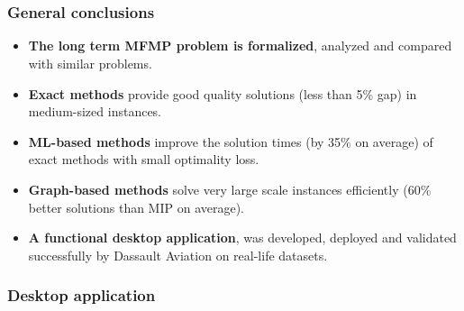 \section[Conclusions]{\conclusiontitle}

\begin{frame}
\frametitle{\textbf{General conclusions}}
    \begin{itemize}[<+->]
    \item \textbf{The long term MFMP problem is formalized}, 
      analyzed and compared with similar problems.
    \item \textbf{Exact methods}
      provide good quality solutions (less than 5\% gap) in medium-sized instances.
    \item \textbf{ML-based methods}
      improve the solution times (by 35\% on average) of exact methods with small optimality loss.
    \item \textbf{Graph-based methods}
      solve very large scale instances efficiently (60\% better solutions than MIP on average).
    \item \textbf{A functional desktop application},
       was developed, deployed and validated successfully by Dassault Aviation on real-life datasets.
    \end{itemize}
\end{frame}

\begin{frame}
\frametitle{\textbf{Desktop application}}

  \centering

\end{frame}

